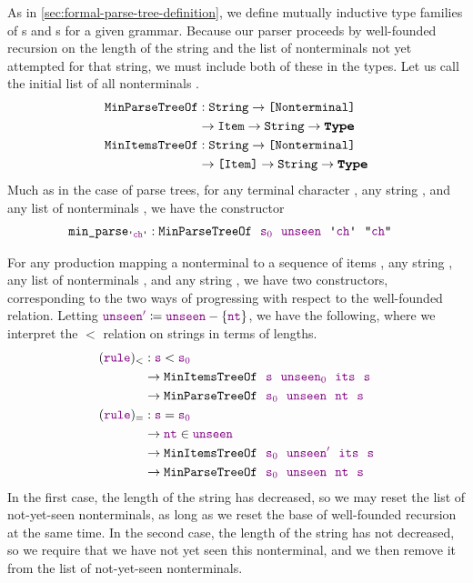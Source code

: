  As in \autoref{sec:formal-parse-tree-definition}, we define mutually inductive type families of s and s for a given grammar.  Because our parser proceeds by well-founded recursion on the length of the string and the list of nonterminals not yet attempted for that string, we must include both of these in the types.  Let us call the initial list of all nonterminals .
  \begin{align*}
    \indname{MinParseTreeOf} & \oftypesep \String \typeto \typelist{\Nonterminal} \\
    & \typeto \indname{Item} \typeto \String \typeto \Type \\
    \indname{MinItemsTreeOf} & \oftypesep \String \typeto \typelist{\Nonterminal} \\
    & \typeto \typelist{\indname{Item}} \typeto \String \typeto \Type
  \end{align*}
  Much as in the case of parse trees, for any terminal character , any string , and any list of nonterminals , we have the constructor
  \begin{align*}
    \fname{min\_parse$_{\terminal{\farg{ch}}}$} & \oftypesep \indname{MinParseTreeOf}~~\farg{s$_0$}~~\farg{unseen}~~\terminal{\farg{ch}}~~\str{\farg{ch}}
  \end{align*}

  For any production  mapping a nonterminal  to a sequence of items , any string , any list of nonterminals , and any string , we have two constructors, corresponding to the two ways of progressing with respect to the well-founded relation.  Letting $\textcolor{violet}{\texttt{unseen$'$}}\coloneqq\textcolor{violet}{\texttt{unseen}} - \{\textcolor{violet}{\texttt{nt}}\}$, we have the following, where we interpret the $<$ relation on strings in terms of lengths.
  \begin{align*}
    (\textcolor{violet}{\texttt{rule}})_< & : \textcolor{violet}{\texttt{s}} < \textcolor{violet}{\texttt{s$_0$}} \\
    & \to \texttt{MinItemsTreeOf}~~\textcolor{violet}{\texttt{s}}~~\textcolor{violet}{\texttt{unseen$_0$}}~~\textcolor{violet}{\texttt{its}}~~\textcolor{violet}{\texttt{s}} \\
    & \to \texttt{MinParseTreeOf}~~\textcolor{violet}{\texttt{s$_0$}}~~\textcolor{violet}{\texttt{unseen}}~~\textcolor{violet}{\texttt{nt}}~~\textcolor{violet}{\texttt{s}} \\
    (\textcolor{violet}{\texttt{rule}})_= & : \textcolor{violet}{\texttt{s}} = \textcolor{violet}{\texttt{s$_0$}} \\
    & \to \textcolor{violet}{\texttt{nt}} \in \textcolor{violet}{\texttt{unseen}} \\
    & \to \texttt{MinItemsTreeOf}~~\textcolor{violet}{\texttt{s$_0$}}~~\textcolor{violet}{\texttt{unseen$'$}}~~\textcolor{violet}{\texttt{its}}~~\textcolor{violet}{\texttt{s}} \\
    & \to \texttt{MinParseTreeOf}~~\textcolor{violet}{\texttt{s$_0$}}~~\textcolor{violet}{\texttt{unseen}}~~\textcolor{violet}{\texttt{nt}}~~\textcolor{violet}{\texttt{s}}
  \end{align*}
  In the first case, the length of the string has decreased, so we may reset the list of not-yet-seen nonterminals, as long as we reset the base of well-founded recursion  at the same time.  In the second case, the length of the string has not decreased, so we require that we have not yet seen this nonterminal, and we then remove it from the list of not-yet-seen nonterminals.

